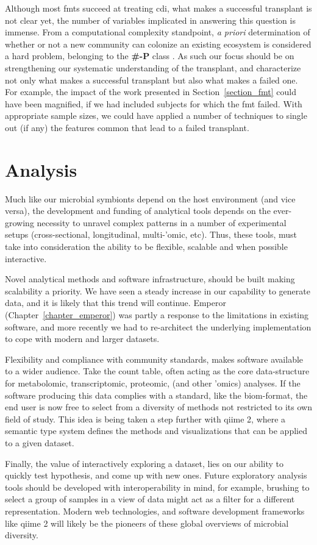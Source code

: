 Although most \glspl{fmt} succeed at treating \gls{cdi}, what makes a
successful transplant is not clear yet, the number of variables implicated in
answering this question is immense. From a computational complexity standpoint,
\textit{a priori} determination of whether or not a new community can colonize 
an existing ecosystem is considered a hard problem, belonging to the 
\textbf{\#-P} class \cite{RN4266}. As such our focus should be on strengthening 
our systematic understanding of the transplant, and characterize not only what 
makes a successful transplant but also what makes a failed one.  For example, 
the impact of the work presented in Section~\ref{section_fmt} could have been 
magnified, if we had included subjects for which the \gls{fmt} failed. With 
appropriate sample sizes, we could have applied a number of techniques to 
single out (if any) the features common that lead to a failed transplant.

\section{Analysis}

Much like our microbial symbionts depend on the host environment (and vice
versa), the development and funding of analytical tools depends on the
ever-growing necessity to unravel complex patterns in a number of experimental
setups (cross-sectional, longitudinal, multi-'omic, etc). Thus, these tools,
must take into consideration the ability to be flexible, scalable and when
possible interactive.

Novel analytical methods and software infrastructure, should be built making 
scalability a priority.  We have seen a steady increase in our capability to 
generate data, and it is likely that this trend will continue. Emperor 
(Chapter~\ref{chapter_emperor}) was partly a response to the limitations in 
existing software, and more recently we had to re-architect the underlying 
implementation to cope with modern and larger datasets.

Flexibility and compliance with community standards, makes software available 
to a wider audience. Take the count table, often acting as the core 
data-structure for metabolomic, transcriptomic, proteomic, (and other 'omics) 
analyses. If the software producing this data complies with a standard, like 
the \gls{biom}-format, the end user is now free to select from a diversity of 
methods not restricted to its own field of study. This idea is being taken a 
step further with \gls{qiime} 2, where a semantic type system defines the 
methods and visualizations that can be applied to a given dataset.

Finally, the value of interactively exploring a dataset, lies on our ability to 
quickly test hypothesis, and come up with new ones. Future exploratory analysis 
tools should be developed with interoperability in mind, for example, brushing 
to select a group of samples in a view of data might act as a filter for a 
different representation. Modern web technologies, and software development 
frameworks like \gls{qiime} 2 will likely be the pioneers of these global 
overviews of microbial diversity.
